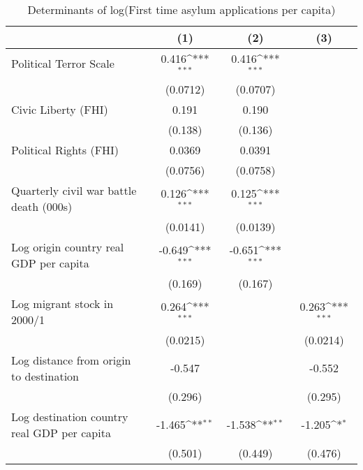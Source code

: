 \begin{table}[htbp]\centering
\def\sym#1{\ifmmode^{#1}\else\(^{#1}\)\fi}
\caption{Determinants of log(First time asylum applications per capita)}
\begin{tabular}{l*{3}{c}}
\hline\hline
                    &\multicolumn{1}{c}{(1)}         &\multicolumn{1}{c}{(2)}         &\multicolumn{1}{c}{(3)}         \\
\hline
Political Terror Scale&       0.416\sym{***}&       0.416\sym{***}&                     \\
                    &    (0.0712)         &    (0.0707)         &                     \\
[1em]
Civic Liberty (FHI) &       0.191         &       0.190         &                     \\
                    &     (0.138)         &     (0.136)         &                     \\
[1em]
Political Rights (FHI)&      0.0369         &      0.0391         &                     \\
                    &    (0.0756)         &    (0.0758)         &                     \\
[1em]
Quarterly civil war battle death (000s)&       0.126\sym{***}&       0.125\sym{***}&                     \\
                    &    (0.0141)         &    (0.0139)         &                     \\
[1em]
Log origin country real GDP per capita&      -0.649\sym{***}&      -0.651\sym{***}&                     \\
                    &     (0.169)         &     (0.167)         &                     \\
[1em]
Log migrant stock in 2000/1&       0.264\sym{***}&                     &       0.263\sym{***}\\
                    &    (0.0215)         &                     &    (0.0214)         \\
[1em]
Log distance from origin to destination&      -0.547         &                     &      -0.552         \\
                    &     (0.296)         &                     &     (0.295)         \\
[1em]
Log destination country real GDP per capita&      -1.465\sym{**} &      -1.538\sym{**} &      -1.205\sym{*}  \\
                    &     (0.501)         &     (0.449)         &     (0.476)         \\

\end{tabular}
\end{table}
